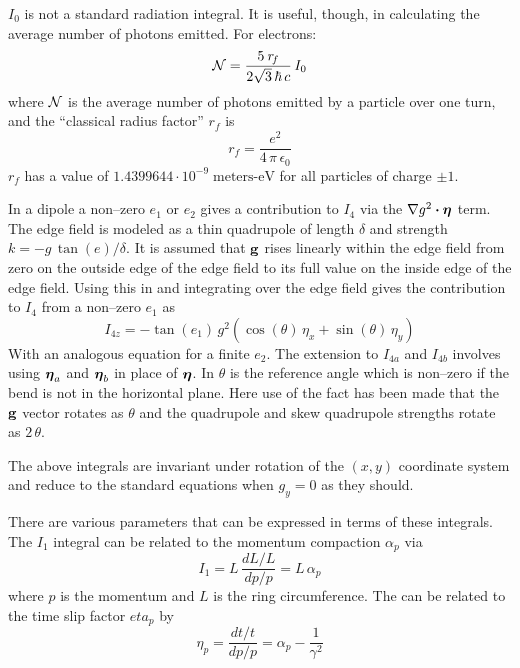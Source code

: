 $I_0$ is not a standard radiation integral. It is useful, though, in calculating the average number
of photons emitted. For electrons:
  \begin{equation}
    {\cal N} = \frac{5 \: r_{\! f}}{2 \sqrt{3} \, \hbar \, c} \, I_0 
  \end{equation}
where $\cal N$ is the average number of photons emitted by a particle
over one turn, and the ``classical radius factor'' $r_{\! f}$ is 
  \begin{equation}
    r_{\! f} = \frac{e^2}{4 \, \pi \, \epsilon_0} 
  \end{equation}
$r_{\! f}$ has a value of $1.4399644 \cdot 10^{-9} \; \text{meters-eV}$
for all particles of charge $\pm 1$.

In a dipole a non--zero $e_1$ or $e_2$ gives a contribution to $I_4$ via the $\nabla g^2 \mathbin{\boldsymbol{\cdot}}
\boldsymbol{\eta}$ term. The edge field is modeled as a thin quadrupole of length $\delta$ and strength $k = -g
\, \tan(e) / \delta$. It is assumed that ${\bf g}$ rises linearly within the edge field from zero on
the outside edge of the edge field to its full value on the inside edge of the edge field. Using
this in  and integrating over the edge field gives the contribution to $I_4$ from a
non--zero $e_1$ as
  \begin{equation}
    I_{4z} = -\tan(e_1) \, g^2
    \left( \cos(\theta) \, \eta_x + \sin(\theta) \, \eta_y \right)
    \label{iegct}
  \end{equation}
With an analogous equation for a finite $e_2$. The extension to $I_{4a}$ and $I_{4b}$ involves using
$\boldsymbol{\eta}_a$ and $\boldsymbol{\eta}_b$ in place of $\boldsymbol{\eta}$.  In  $\theta$ is the reference
 angle which is non--zero if the bend is not in the horizontal plane. Here use of the fact
has been made that the ${\bf g}$ vector rotates as $\theta$ and the quadrupole and skew quadrupole
strengths rotate as $2\, \theta$.

The above integrals are invariant under rotation of the $(x,y)$ coordinate system and reduce to the
standard equations when $g_y = 0$ as they should.

There are various parameters that can be expressed in terms of these integrals. The $I_1$ integral
can be related to the momentum compaction $\alpha_p$ via
  \begin{equation}
    I_1 = L \, \frac{dL/L}{dp/p} = L \, \alpha_p
  \end{equation}
where $p$ is the momentum and $L$ is the ring circumference. The can be related to the time slip
factor $eta_p$ by
\begin{equation}
  \eta_p = \frac{dt/t}{dp/p} = \alpha_p - \frac{1}{\gamma^2}
\end{equation}

